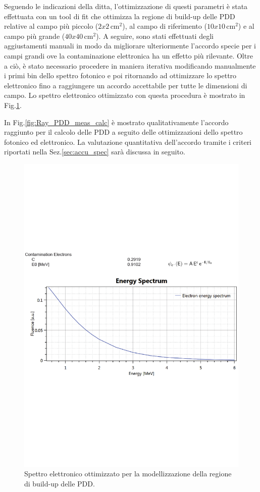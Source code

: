Seguendo le indicazioni della ditta, l'ottimizzazione di questi parametri è stata effettuata con un tool di fit che ottimizza la regione di build-up delle PDD relative al campo più piccolo ($2x2\,$cm$^2$), al campo di riferimento ($10x10\,$cm$^2$) e al campo più grande ($40x40\,$cm$^2$). A seguire, sono stati effettuati degli aggiustamenti manuali in modo da migliorare ulteriormente l'accordo specie per i campi grandi ove la contaminazione elettronica ha un effetto più rilevante. Oltre a ciò, è stato necessario procedere in maniera iterativa modificando manualmente i primi bin dello spettro fotonico e poi ritornando ad ottimizzare lo spettro elettronico fino a raggiungere un accordo accettabile per tutte le dimensioni di campo. Lo spettro elettronico ottimizzato con questa procedura è mostrato in Fig.\ref{fig:Ray_spectrum_ele}.

In Fig.\ref{fig:Ray_PDD_meas_calc} è mostrato qualitativamente l'accordo raggiunto per il calcolo delle PDD a seguito delle ottimizzazioni dello spettro fotonico ed elettronico. La valutazione quantitativa dell'accordo tramite i criteri riportati nella Sez.\ref{sec:accu_spec} sarà discussa in seguito.

\begin{figure}
\centering
\includegraphics[width=\textwidth]{./cap2/Ray_spectrum_ele.pdf}
\caption{Spettro elettronico ottimizzato per la modellizzazione della regione di build-up delle PDD.}
\label{fig:Ray_spectrum_ele}
\end{figure}

